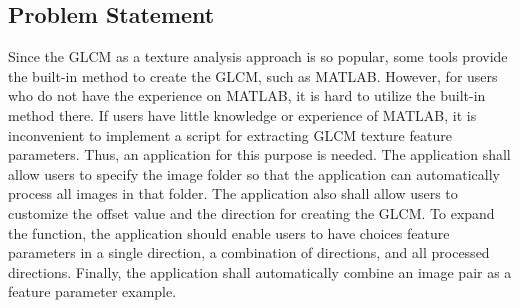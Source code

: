 \subsection{Problem Statement}
Since the GLCM as a texture analysis approach is so popular, some tools provide the built-in method to create the GLCM, such as MATLAB. However, for users who do not have the experience on MATLAB, it is hard to utilize the built-in method there. If users have little knowledge or experience of MATLAB, it is inconvenient to implement a script for extracting GLCM texture feature parameters. Thus, an application for this purpose is needed. The application shall allow users to specify the image folder so that the application can automatically process all images in that folder. The application also shall allow users to customize the offset value and the direction for creating the GLCM. To expand the function, the application should enable users to have choices feature parameters in a single direction, a combination of directions, and all processed directions. Finally, the application shall automatically combine an image pair as a feature parameter example.  
